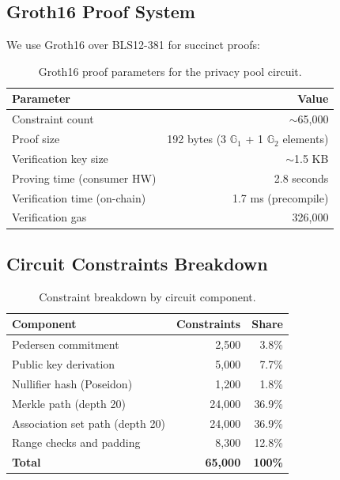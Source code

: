 \documentclass[11pt,a4paper]{article}
\begin{document}
\subsection{Groth16 Proof System}

We use Groth16 \cite{groth2016size} over BLS12-381 for succinct proofs:

\begin{table}[H]
\centering
\caption{Groth16 proof parameters for the privacy pool circuit.}
\label{tab:groth16}
\begin{tabular}{lr}
\toprule
\textbf{Parameter} & \textbf{Value} \\
\midrule
Constraint count & $\sim$65,000 \\
Proof size & 192 bytes (3 $\mathbb{G}_1$ + 1 $\mathbb{G}_2$ elements) \\
Verification key size & $\sim$1.5 KB \\
Proving time (consumer HW) & 2.8 seconds \\
Verification time (on-chain) & 1.7 ms (precompile) \\
Verification gas & 326,000 \\
\bottomrule
\end{tabular}
\end{table}

\subsection{Circuit Constraints Breakdown}

\begin{table}[H]
\centering
\caption{Constraint breakdown by circuit component.}
\label{tab:constraints}
\begin{tabular}{lrr}
\toprule
\textbf{Component} & \textbf{Constraints} & \textbf{Share} \\
\midrule
Pedersen commitment & 2,500 & 3.8\% \\
Public key derivation & 5,000 & 7.7\% \\
Nullifier hash (Poseidon) & 1,200 & 1.8\% \\
Merkle path (depth 20) & 24,000 & 36.9\% \\
Association set path (depth 20) & 24,000 & 36.9\% \\
Range checks and padding & 8,300 & 12.8\% \\
\midrule
\textbf{Total} & \textbf{65,000} & \textbf{100\%} \\
\bottomrule
\end{tabular}
\end{table}
\end{document}
